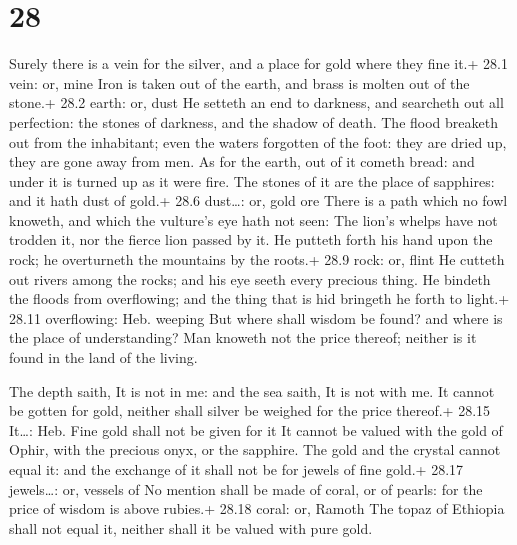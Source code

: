 \hypertarget{section-27}{%
\section{28}\label{section-27}}

 Surely there is a vein for the silver, and a place for gold
where they fine it.+ 28.1 vein: or, mine  Iron is taken out
of the earth, and brass is molten out of the stone.+ 28.2 earth: or,
dust  He setteth an end to darkness, and searcheth out all
perfection: the stones of darkness, and the shadow of death.
 The flood breaketh out from the inhabitant; even the waters
forgotten of the foot: they are dried up, they are gone away from men.
 As for the earth, out of it cometh bread: and under it is
turned up as it were fire.  The stones of it are the place
of sapphires: and it hath dust of gold.+ 28.6 dust\ldots: or, gold ore
 There is a path which no fowl knoweth, and which the
vulture's eye hath not seen:  The lion's whelps have not
trodden it, nor the fierce lion passed by it.  He putteth
forth his hand upon the rock; he overturneth the mountains by the
roots.+ 28.9 rock: or, flint  He cutteth out rivers among
the rocks; and his eye seeth every precious thing.  He
bindeth the floods from overflowing; and the thing that is hid bringeth
he forth to light.+ 28.11 overflowing: Heb. weeping  But
where shall wisdom be found? and where is the place of understanding?
 Man knoweth not the price thereof; neither is it found in
the land of the living.

 The depth saith, It is not in me: and the sea saith, It is
not with me.  It cannot be gotten for gold, neither shall
silver be weighed for the price thereof.+ 28.15 It\ldots: Heb. Fine gold
shall not be given for it  It cannot be valued with the
gold of Ophir, with the precious onyx, or the sapphire. 
The gold and the crystal cannot equal it: and the exchange of it shall
not be for jewels of fine gold.+ 28.17 jewels\ldots: or, vessels of
 No mention shall be made of coral, or of pearls: for the
price of wisdom is above rubies.+ 28.18 coral: or, Ramoth 
The topaz of Ethiopia shall not equal it, neither shall it be valued
with pure gold.

